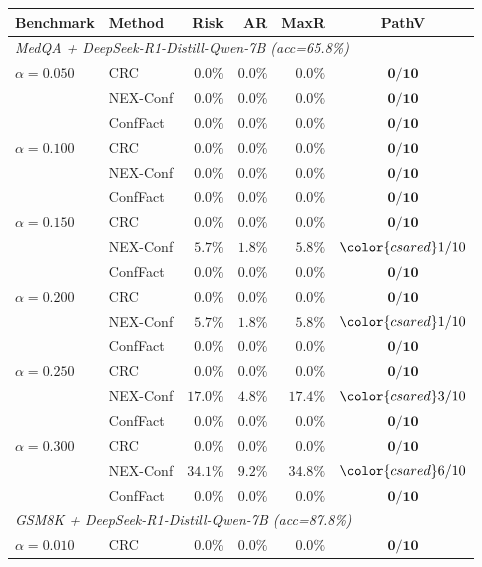 \begin{table}[!ht]
\centering\scriptsize
\setlength{\tabcolsep}{3pt}
\begin{tabular}{llrrrc}
\toprule
Benchmark & Method & Risk & AR & MaxR & PathV \\
\midrule
\multicolumn{6}{l}{\emph{MedQA + DeepSeek-R1-Distill-Qwen-7B (acc=65.8\%)}} \\
$\alpha=0.050$ & CRC & $0.0\%$ & $0.0\%$ & $0.0\%$ & $\mathbf{0/10}$ \\
 & NEX-Conf & $0.0\%$ & $0.0\%$ & $0.0\%$ & $\mathbf{0/10}$ \\
 & ConfFact & $0.0\%$ & $0.0\%$ & $0.0\%$ & $\mathbf{0/10}$ \\
\midrule
$\alpha=0.100$ & CRC & $0.0\%$ & $0.0\%$ & $0.0\%$ & $\mathbf{0/10}$ \\
 & NEX-Conf & $0.0\%$ & $0.0\%$ & $0.0\%$ & $\mathbf{0/10}$ \\
 & ConfFact & $0.0\%$ & $0.0\%$ & $0.0\%$ & $\mathbf{0/10}$ \\
\midrule
$\alpha=0.150$ & CRC & $0.0\%$ & $0.0\%$ & $0.0\%$ & $\mathbf{0/10}$ \\
 & NEX-Conf & $5.7\%$ & $1.8\%$ & $5.8\%$ & ${\color{csared}1/10}$ \\
 & ConfFact & $0.0\%$ & $0.0\%$ & $0.0\%$ & $\mathbf{0/10}$ \\
\midrule
$\alpha=0.200$ & CRC & $0.0\%$ & $0.0\%$ & $0.0\%$ & $\mathbf{0/10}$ \\
 & NEX-Conf & $5.7\%$ & $1.8\%$ & $5.8\%$ & ${\color{csared}1/10}$ \\
 & ConfFact & $0.0\%$ & $0.0\%$ & $0.0\%$ & $\mathbf{0/10}$ \\
\midrule
$\alpha=0.250$ & CRC & $0.0\%$ & $0.0\%$ & $0.0\%$ & $\mathbf{0/10}$ \\
 & NEX-Conf & $17.0\%$ & $4.8\%$ & $17.4\%$ & ${\color{csared}3/10}$ \\
 & ConfFact & $0.0\%$ & $0.0\%$ & $0.0\%$ & $\mathbf{0/10}$ \\
\midrule
$\alpha=0.300$ & CRC & $0.0\%$ & $0.0\%$ & $0.0\%$ & $\mathbf{0/10}$ \\
 & NEX-Conf & $34.1\%$ & $9.2\%$ & $34.8\%$ & ${\color{csared}6/10}$ \\
 & ConfFact & $0.0\%$ & $0.0\%$ & $0.0\%$ & $\mathbf{0/10}$ \\
\midrule
\midrule
\multicolumn{6}{l}{\emph{GSM8K + DeepSeek-R1-Distill-Qwen-7B (acc=87.8\%)}} \\
$\alpha=0.010$ & CRC & $0.0\%$ & $0.0\%$ & $0.0\%$ & $\mathbf{0/10}$ \\

\end{tabular}
\end{table}
